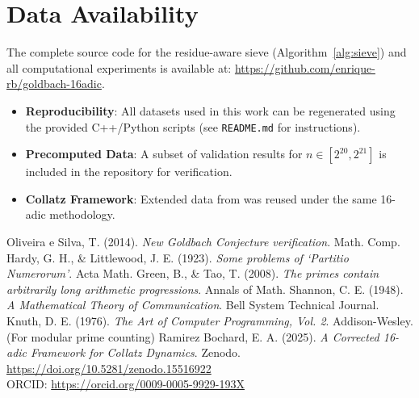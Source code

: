 \documentclass[12pt]{article}
\begin{document}
	\section*{Data Availability}  
	The complete source code for the residue-aware sieve (Algorithm~\ref{alg:sieve}) and all computational experiments is available at:  
	\url{https://github.com/enrique-rb/goldbach-16adic}.  
	
	\begin{itemize}  
		\item \textbf{Reproducibility}: All datasets used in this work can be regenerated using the provided C++/Python scripts (see \texttt{README.md} for instructions).  
		\item \textbf{Precomputed Data}: A subset of validation results for $n \in [2^{20}, 2^{21}]$ is included in the repository for verification.  
		\item \textbf{Collatz Framework}: Extended data from \cite{collatz_paper} was reused under the same 16-adic methodology.  
	\end{itemize}  
		
	\begin{thebibliography}{9}
		 Oliveira e Silva, T. (2014). \textit{New Goldbach Conjecture verification}. Math. Comp.
		 Hardy, G. H., \& Littlewood, J. E. (1923). \textit{Some problems of ‘Partitio Numerorum’}. Acta Math.
		 Green, B., \& Tao, T. (2008). \textit{The primes contain arbitrarily long arithmetic progressions}. Annals of Math.
		Shannon, C. E. (1948). \textit{A Mathematical Theory of Communication}. Bell System Technical Journal.
		Knuth, D. E. (1976). \textit{The Art of Computer Programming, Vol. 2}. Addison-Wesley. (For modular prime counting)
		 Ramirez Bochard, E. A. (2025). \textit{A Corrected 16-adic Framework for Collatz Dynamics}. 
		Zenodo. \url{https://doi.org/10.5281/zenodo.15516922} \\
		ORCID: \url{https://orcid.org/0009-0005-9929-193X}
	\end{thebibliography}
	
\end{document}

